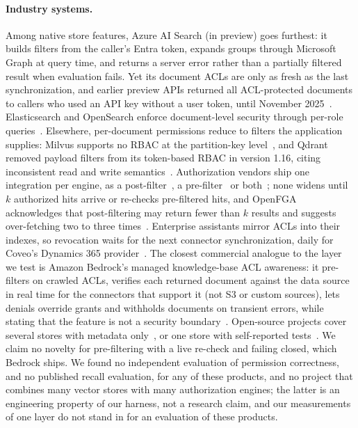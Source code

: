 \paragraph{Industry systems.}
Among native store features, Azure AI Search (in preview) goes furthest: it builds filters from the
caller's Entra token, expands groups through Microsoft Graph at query time, and returns a server error
rather than a partially filtered result when evaluation fails. Yet its document ACLs are only as fresh
as the last synchronization, and earlier preview APIs returned all ACL-protected documents to callers
who used an API key without a user token, until November 2025~\cite{microsoft2026querytime}.
Elasticsearch and OpenSearch enforce document-level security through per-role
queries~\cite{elastic2026controlling,opensearch2026documentlevel}. Elsewhere,
per-document permissions reduce to filters the application supplies: Milvus supports no RBAC at the
partition-key level~\cite{milvus2026implement}, and Qdrant removed payload filters from its
token-based RBAC in version 1.16, citing inconsistent read and write semantics~\cite{qdrant2025release}.
Authorization vendors ship one integration per engine, as a post-filter~\cite{auth02026authorization},
a pre-filter~\cite{cerbos2026implementing} or both~\cite{authzed2026langchainspicedb}; none widens
until $k$ authorized hits arrive or re-checks pre-filtered hits, and OpenFGA acknowledges that
post-filtering may return fewer than $k$ results and suggests over-fetching two to three
times~\cite{openfga2026rag}. Enterprise assistants mirror ACLs into their indexes, so revocation waits
for the next connector synchronization, daily for Coveo's Dynamics 365 provider~\cite{coveo2026coveo}.
The closest commercial analogue to the layer we test is Amazon Bedrock's managed knowledge-base ACL
awareness: it pre-filters on crawled ACLs, verifies each returned document against the data source in
real time for the connectors that support it (not S3 or custom sources), lets denials override grants and withholds documents on transient errors, while stating
that the feature is not a security boundary~\cite{aws2026access}. Open-source projects cover several
stores with metadata only~\cite{langchain2026pebbloretrieval}, or one store with self-reported
tests~\cite{gelevanog2026permissionaware}. We claim no novelty for pre-filtering with a live re-check
and failing closed, which Bedrock ships. We found no independent evaluation of permission
correctness, and no published recall evaluation, for any of these products, and no project that
combines many vector stores with many authorization engines; the latter is an engineering property of
our harness, not a research claim, and our measurements of one layer do not stand in for an evaluation of these products.
